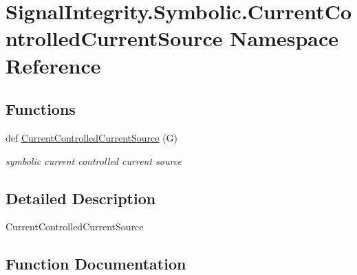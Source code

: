 \hypertarget{namespaceSignalIntegrity_1_1Symbolic_1_1CurrentControlledCurrentSource}{}\section{Signal\+Integrity.\+Symbolic.\+Current\+Controlled\+Current\+Source Namespace Reference}
\label{namespaceSignalIntegrity_1_1Symbolic_1_1CurrentControlledCurrentSource}
\subsection*{Functions}
\begin{DoxyCompactItemize}
\item 
def \hyperlink{namespaceSignalIntegrity_1_1Symbolic_1_1CurrentControlledCurrentSource_a6bb146452fe92138a03b0c7b1c51fcbf}{Current\+Controlled\+Current\+Source} (G)
\begin{DoxyCompactList}\small\item\em symbolic current controlled current source \end{DoxyCompactList}\end{DoxyCompactItemize}


\subsection{Detailed Description}
\begin{DoxyVerb}CurrentControlledCurrentSource\end{DoxyVerb}
 

\subsection{Function Documentation}
\mbox{\label{namespaceSignalIntegrity_1_1Symbolic_1_1CurrentControlledCurrentSource_a6bb146452fe92138a03b0c7b1c51fcbf}} 
